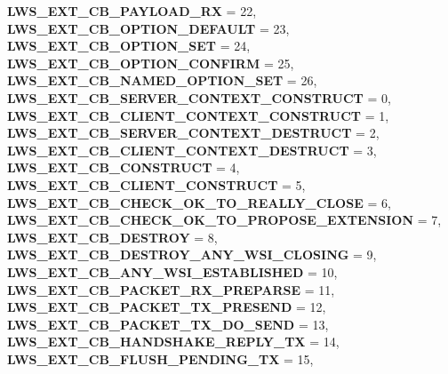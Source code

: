 \begin{DoxyCompactItemize}
{\bfseries L\+W\+S\+\_\+\+E\+X\+T\+\_\+\+C\+B\+\_\+\+P\+A\+Y\+L\+O\+A\+D\+\_\+\+RX} = 22, 
{\bfseries L\+W\+S\+\_\+\+E\+X\+T\+\_\+\+C\+B\+\_\+\+O\+P\+T\+I\+O\+N\+\_\+\+D\+E\+F\+A\+U\+LT} = 23, 
{\bfseries L\+W\+S\+\_\+\+E\+X\+T\+\_\+\+C\+B\+\_\+\+O\+P\+T\+I\+O\+N\+\_\+\+S\+ET} = 24, 
{\bfseries L\+W\+S\+\_\+\+E\+X\+T\+\_\+\+C\+B\+\_\+\+O\+P\+T\+I\+O\+N\+\_\+\+C\+O\+N\+F\+I\+RM} = 25, 
\newline
{\bfseries L\+W\+S\+\_\+\+E\+X\+T\+\_\+\+C\+B\+\_\+\+N\+A\+M\+E\+D\+\_\+\+O\+P\+T\+I\+O\+N\+\_\+\+S\+ET} = 26, 
{\bfseries L\+W\+S\+\_\+\+E\+X\+T\+\_\+\+C\+B\+\_\+\+S\+E\+R\+V\+E\+R\+\_\+\+C\+O\+N\+T\+E\+X\+T\+\_\+\+C\+O\+N\+S\+T\+R\+U\+CT} = 0, 
{\bfseries L\+W\+S\+\_\+\+E\+X\+T\+\_\+\+C\+B\+\_\+\+C\+L\+I\+E\+N\+T\+\_\+\+C\+O\+N\+T\+E\+X\+T\+\_\+\+C\+O\+N\+S\+T\+R\+U\+CT} = 1, 
{\bfseries L\+W\+S\+\_\+\+E\+X\+T\+\_\+\+C\+B\+\_\+\+S\+E\+R\+V\+E\+R\+\_\+\+C\+O\+N\+T\+E\+X\+T\+\_\+\+D\+E\+S\+T\+R\+U\+CT} = 2, 
\newline
{\bfseries L\+W\+S\+\_\+\+E\+X\+T\+\_\+\+C\+B\+\_\+\+C\+L\+I\+E\+N\+T\+\_\+\+C\+O\+N\+T\+E\+X\+T\+\_\+\+D\+E\+S\+T\+R\+U\+CT} = 3, 
{\bfseries L\+W\+S\+\_\+\+E\+X\+T\+\_\+\+C\+B\+\_\+\+C\+O\+N\+S\+T\+R\+U\+CT} = 4, 
{\bfseries L\+W\+S\+\_\+\+E\+X\+T\+\_\+\+C\+B\+\_\+\+C\+L\+I\+E\+N\+T\+\_\+\+C\+O\+N\+S\+T\+R\+U\+CT} = 5, 
{\bfseries L\+W\+S\+\_\+\+E\+X\+T\+\_\+\+C\+B\+\_\+\+C\+H\+E\+C\+K\+\_\+\+O\+K\+\_\+\+T\+O\+\_\+\+R\+E\+A\+L\+L\+Y\+\_\+\+C\+L\+O\+SE} = 6, 
\newline
{\bfseries L\+W\+S\+\_\+\+E\+X\+T\+\_\+\+C\+B\+\_\+\+C\+H\+E\+C\+K\+\_\+\+O\+K\+\_\+\+T\+O\+\_\+\+P\+R\+O\+P\+O\+S\+E\+\_\+\+E\+X\+T\+E\+N\+S\+I\+ON} = 7, 
{\bfseries L\+W\+S\+\_\+\+E\+X\+T\+\_\+\+C\+B\+\_\+\+D\+E\+S\+T\+R\+OY} = 8, 
{\bfseries L\+W\+S\+\_\+\+E\+X\+T\+\_\+\+C\+B\+\_\+\+D\+E\+S\+T\+R\+O\+Y\+\_\+\+A\+N\+Y\+\_\+\+W\+S\+I\+\_\+\+C\+L\+O\+S\+I\+NG} = 9, 
{\bfseries L\+W\+S\+\_\+\+E\+X\+T\+\_\+\+C\+B\+\_\+\+A\+N\+Y\+\_\+\+W\+S\+I\+\_\+\+E\+S\+T\+A\+B\+L\+I\+S\+H\+ED} = 10, 
\newline
{\bfseries L\+W\+S\+\_\+\+E\+X\+T\+\_\+\+C\+B\+\_\+\+P\+A\+C\+K\+E\+T\+\_\+\+R\+X\+\_\+\+P\+R\+E\+P\+A\+R\+SE} = 11, 
{\bfseries L\+W\+S\+\_\+\+E\+X\+T\+\_\+\+C\+B\+\_\+\+P\+A\+C\+K\+E\+T\+\_\+\+T\+X\+\_\+\+P\+R\+E\+S\+E\+ND} = 12, 
{\bfseries L\+W\+S\+\_\+\+E\+X\+T\+\_\+\+C\+B\+\_\+\+P\+A\+C\+K\+E\+T\+\_\+\+T\+X\+\_\+\+D\+O\+\_\+\+S\+E\+ND} = 13, 
{\bfseries L\+W\+S\+\_\+\+E\+X\+T\+\_\+\+C\+B\+\_\+\+H\+A\+N\+D\+S\+H\+A\+K\+E\+\_\+\+R\+E\+P\+L\+Y\+\_\+\+TX} = 14, 
\newline
{\bfseries L\+W\+S\+\_\+\+E\+X\+T\+\_\+\+C\+B\+\_\+\+F\+L\+U\+S\+H\+\_\+\+P\+E\+N\+D\+I\+N\+G\+\_\+\+TX} = 15, 

\end{DoxyCompactItemize}
